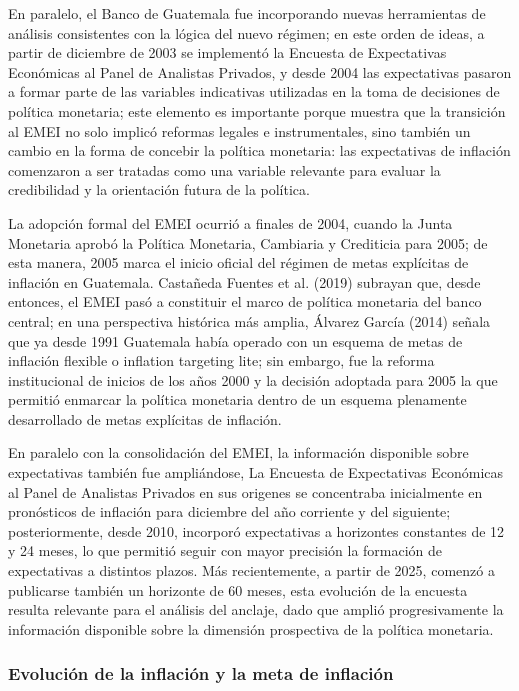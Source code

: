 \documentclass[
  10.5pt,
  letterpaper,
  twocolumn]{article}
\begin{document}
En paralelo, el Banco de Guatemala fue incorporando nuevas herramientas
de análisis consistentes con la lógica del nuevo régimen; en este orden
de ideas, a partir de diciembre de 2003 se implementó la Encuesta de
Expectativas Económicas al Panel de Analistas Privados, y desde 2004 las
expectativas pasaron a formar parte de las variables indicativas
utilizadas en la toma de decisiones de política monetaria; este elemento
es importante porque muestra que la transición al EMEI no solo implicó
reformas legales e instrumentales, sino también un cambio en la forma de
concebir la política monetaria: las expectativas de inflación comenzaron
a ser tratadas como una variable relevante para evaluar la credibilidad
y la orientación futura de la política.

La adopción formal del EMEI ocurrió a finales de 2004, cuando la Junta
Monetaria aprobó la Política Monetaria, Cambiaria y Crediticia para
2005; de esta manera, 2005 marca el inicio oficial del régimen de metas
explícitas de inflación en Guatemala. Castañeda Fuentes et al. (2019)
subrayan que, desde entonces, el EMEI pasó a constituir el marco de
política monetaria del banco central; en una perspectiva histórica más
amplia, Álvarez García (2014) señala que ya desde 1991 Guatemala había
operado con un esquema de metas de inflación flexible o inflation
targeting lite; sin embargo, fue la reforma institucional de inicios de
los años 2000 y la decisión adoptada para 2005 la que permitió enmarcar
la política monetaria dentro de un esquema plenamente desarrollado de
metas explícitas de inflación.

En paralelo con la consolidación del EMEI, la información disponible
sobre expectativas también fue ampliándose, La Encuesta de Expectativas
Económicas al Panel de Analistas Privados en sus origenes se concentraba
inicialmente en pronósticos de inflación para diciembre del año
corriente y del siguiente; posteriormente, desde 2010, incorporó
expectativas a horizontes constantes de 12 y 24 meses, lo que permitió
seguir con mayor precisión la formación de expectativas a distintos
plazos. Más recientemente, a partir de 2025, comenzó a publicarse
también un horizonte de 60 meses, esta evolución de la encuesta resulta
relevante para el análisis del anclaje, dado que amplió progresivamente
la información disponible sobre la dimensión prospectiva de la política
monetaria.

\subsubsection{Evolución de la inflación y la meta de
inflación}\label{evoluciuxf3n-de-la-inflaciuxf3n-y-la-meta-de-inflaciuxf3n}
\end{document}
